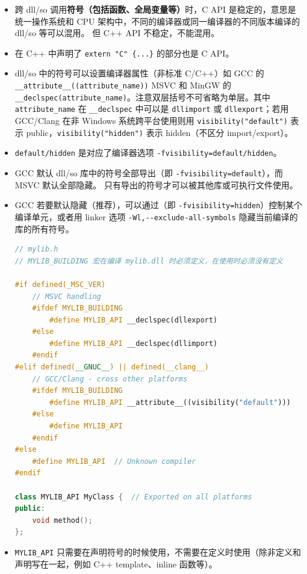 

\begin{itemize}
\item 跨 dll/so 调用\textbf{符号（包括函数、全局变量等）}时，C API 是稳定的，意思是统一操作系统和 CPU 架构中，不同的编译器或同一编译器的不同版本编译的 dll/so 等可以混用。 但 C++ API 不稳定，不能混用。
\item 在 C++ 中声明了 \verb`extern "C" {...}` 的部分也是 C API。
\item dll/so 中的符号可以设置编译器属性（非标准 C/C++）如 GCC 的 \verb`__attribute__((attribute_name))` MSVC 和 MinGW 的 \verb`__declspec(attribute_name)`。注意双层括号不可省略为单层。其中 \verb`attribute_name` 在 \verb`__declspec` 中可以是 \verb`dllimport` 或 \verb`dllexport`；若用 GCC/Clang 在非 Windows 系统跨平台使用则用 \verb`visibility("default")` 表示 public，\verb`visibility("hidden")` 表示 hidden（不区分 import/export）。
\item \verb`default/hidden` 是对应了编译器选项 \verb`-fvisibility=default/hidden`。
\item GCC 默认 dll/so 库中的符号全部导出（即 \verb`-fvisibility=default`），而 MSVC 默认全部隐藏。 只有导出的符号才可以被其他库或可执行文件使用。
\item GCC 若要默认隐藏（推荐），可以通过（即 \verb`-fvisibility=hidden`）控制某个编译单元，或者用 linker 选项 \verb`-Wl,--exclude-all-symbols` 隐藏当前编译的库的所有符号。
\begin{lstlisting}[language=cpp]
// mylib.h
// MYLIB_BUILDING 宏在编译 mylib.dll 时必须定义，在使用时必须没有定义

#if defined(_MSC_VER)
    // MSVC handling
    #ifdef MYLIB_BUILDING
        #define MYLIB_API __declspec(dllexport)
    #else
        #define MYLIB_API __declspec(dllimport)
    #endif
#elif defined(__GNUC__) || defined(__clang__)
    // GCC/Clang - cross other platforms
    #ifdef MYLIB_BUILDING
        #define MYLIB_API __attribute__((visibility("default")))
    #else
        #define MYLIB_API
    #endif
#else
    #define MYLIB_API  // Unknown compiler
#endif

class MYLIB_API MyClass {  // Exported on all platforms
public:
    void method();
};
\end{lstlisting}
\item \verb`MYLIB_API` 只需要在声明符号的时候使用，不需要在定义时使用（除非定义和声明写在一起，例如 C++ template、inline 函数等）。


\end{itemize}

